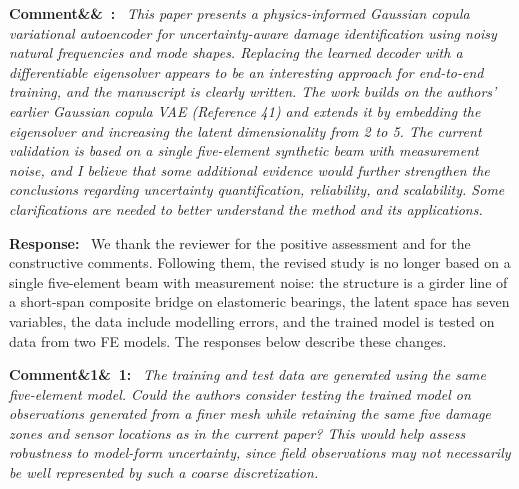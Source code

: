 \documentclass[11pt]{article}
\newenvironment{rcomment}[1]{\par\bigskip\noindent\textbf{Comment\ifx&#1&\else\ #1\fi:}\ \itshape}{\par}
\newenvironment{response}{\par\smallskip\noindent\color{resp}\textbf{Response:}\ }{\par}
\begin{document}
\begin{rcomment}{}
This paper presents a physics-informed Gaussian copula variational autoencoder for uncertainty-aware damage
identification using noisy natural frequencies and mode shapes. Replacing the learned decoder with a differentiable
eigensolver appears to be an interesting approach for end-to-end training, and the manuscript is clearly written. The work
builds on the authors' earlier Gaussian copula VAE (Reference 41) and extends it by embedding the eigensolver and
increasing the latent dimensionality from 2 to 5. The current validation is based on a single five-element synthetic
beam with measurement noise, and I believe that some additional evidence would further strengthen the conclusions
regarding uncertainty quantification, reliability, and scalability. Some clarifications are needed to better understand
the method and its applications.
\end{rcomment}

\begin{response}
We thank the reviewer for the positive assessment and for the constructive comments. Following them, the revised
study is no longer based on a single five-element beam with measurement noise: the structure is a girder line of a
short-span composite bridge on elastomeric bearings, the latent space has seven variables, the data include modelling
errors, and the trained model is tested on data from two FE models. The responses below describe these changes.
\end{response}

\begin{rcomment}{1}
The training and test data are generated using the same five-element model. Could the authors consider testing the
trained model on observations generated from a finer mesh while retaining the same five damage zones and sensor
locations as in the current paper? This would help assess robustness to model-form uncertainty, since field observations
may not necessarily be well represented by such a coarse discretization.
\end{rcomment}
\end{document}
